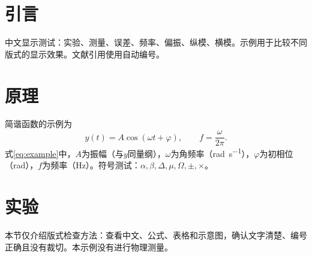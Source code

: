 \section{引言}
中文显示测试：实验、测量、误差、频率、偏振、纵模、横模。示例用于比较不同版式的显示效果。文献引用使用自动编号\cite{lamport}。

\section{原理}
简谐函数的示例为
\begin{equation}
  y(t)=A\cos(\omega t+\varphi),\qquad f=\frac{\omega}{2\pi}.
  \label{eq:example}
\end{equation}
式\eqref{eq:example}中，$A$为振幅（与$y$同量纲），$\omega$为角频率（\si{\radian\per\second}），$\varphi$为初相位（\si{\radian}），$f$为频率（\si{\hertz}）。符号测试：$\alpha,\beta,\Delta,\mu,\Omega,\pm,\times$。

\section{实验}
本节仅介绍版式检查方法：查看中文、公式、表格和示意图，确认文字清楚、编号正确且没有裁切。本示例没有进行物理测量。

